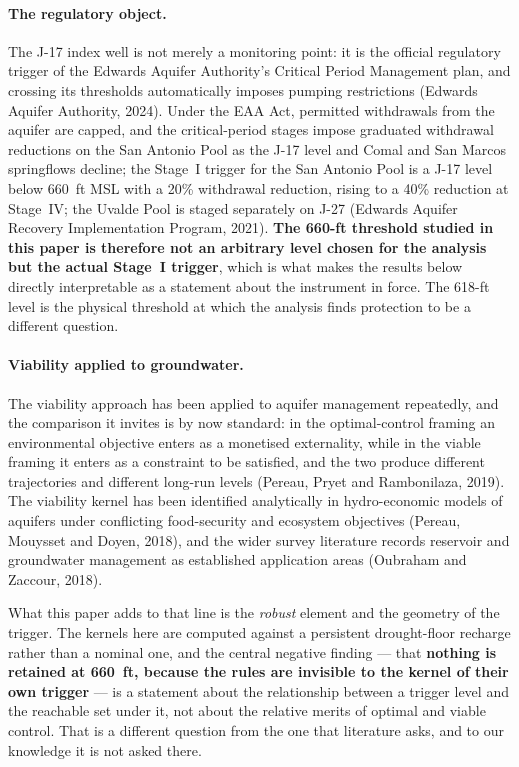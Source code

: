 \paragraph{The regulatory object.} The J-17 index well is not merely a monitoring point: it
is the official regulatory trigger of the Edwards Aquifer Authority's Critical Period
Management plan, and crossing its thresholds automatically imposes pumping restrictions
(Edwards Aquifer Authority, 2024). Under the EAA Act, permitted withdrawals from the aquifer
are capped, and the critical-period stages impose graduated withdrawal reductions on the San
Antonio Pool as the J-17 level and Comal and San Marcos springflows decline; the Stage~I
trigger for the San Antonio Pool is a J-17 level below 660~ft MSL with a 20\% withdrawal
reduction, rising to a 40\% reduction at Stage~IV; the Uvalde Pool is staged separately on
J-27 (Edwards Aquifer Recovery Implementation Program, 2021). \textbf{The 660-ft threshold
studied in this paper is therefore not an arbitrary level chosen for the analysis but the
actual Stage~I trigger}, which is what makes the results below directly interpretable as a
statement about the instrument in force. The 618-ft level is the physical threshold at which
the analysis finds protection to be a different question.

\paragraph{Viability applied to groundwater.} The viability approach has been applied to
aquifer management repeatedly, and the comparison it invites is by now standard: in the
optimal-control framing an environmental objective enters as a monetised externality, while
in the viable framing it enters as a constraint to be satisfied, and the two produce
different trajectories and different long-run levels (Pereau, Pryet and Rambonilaza, 2019).
The viability kernel has been identified analytically in hydro-economic models of aquifers
under conflicting food-security and ecosystem objectives (Pereau, Mouysset and Doyen, 2018),
and the wider survey literature records reservoir and groundwater management as established
application areas (Oubraham and Zaccour, 2018).

What this paper adds to that line is the \emph{robust} element and the geometry of the
trigger. The kernels here are computed against a persistent drought-floor recharge rather
than a nominal one, and the central negative finding --- that \textbf{nothing is retained at
660~ft, because the rules are invisible to the kernel of their own trigger} --- is a
statement about the relationship between a trigger level and the reachable set under it, not
about the relative merits of optimal and viable control. That is a different question from
the one that literature asks, and to our knowledge it is not asked there.

